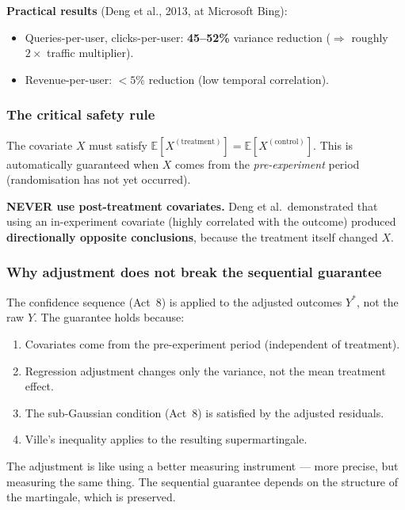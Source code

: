 \documentclass[12pt, a4paper]{article}
\newcommand{\E}{\mathbb{E}}            %
\begin{document}
\textbf{Practical results} (Deng et al., 2013, at Microsoft Bing):
\begin{itemize}[nosep]
  \item Queries-per-user, clicks-per-user: \textbf{45--52\%} variance
        reduction ($\Rightarrow$ roughly $2\times$ traffic multiplier).
  \item Revenue-per-user: $< 5\%$ reduction (low temporal correlation).
\end{itemize}

\subsubsection*{The critical safety rule}

\begin{keytakeaway}
The covariate $X$ must satisfy $\E[X^{(\text{treatment})}] =
\E[X^{(\text{control})}]$.  This is automatically guaranteed when $X$ comes
from the \emph{pre-experiment} period (randomisation has not yet occurred).

\textbf{NEVER use post-treatment covariates.}  Deng et al.\ demonstrated
that using an in-experiment covariate (highly correlated with the outcome)
produced \textbf{directionally opposite conclusions}, because the treatment
itself changed $X$.
\end{keytakeaway}

\subsubsection*{Why adjustment does not break the sequential guarantee}

The confidence sequence (Act~8) is applied to the adjusted outcomes $Y^*$,
not the raw $Y$.  The guarantee holds because:
\begin{enumerate}[nosep]
  \item Covariates come from the pre-experiment period (independent of
        treatment).
  \item Regression adjustment changes only the variance, not the mean
        treatment effect.
  \item The sub-Gaussian condition (Act~8) is satisfied by the adjusted
        residuals.
  \item Ville's inequality applies to the resulting supermartingale.
\end{enumerate}

\begin{plainlanguage}
The adjustment is like using a better measuring instrument --- more precise,
but measuring the same thing.  The sequential guarantee depends on the
structure of the martingale, which is preserved.
\end{plainlanguage}
\end{document}
